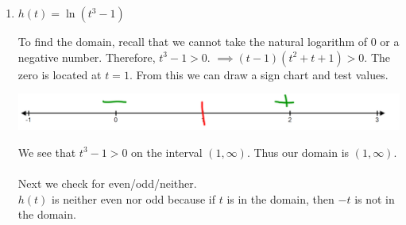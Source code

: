 \documentclass[nooutcomes]{ximera}
\begin{document}
\begin{problem}
\begin{enumerate}
\begin{freeResponse}
		\end{freeResponse}

	\item $h(t)= \ln(t^3-1)$

		\begin{freeResponse}
		To find the domain, recall that we cannot take the natural logarithm of $0$ or a negative number.  Therefore, $t^3-1>0$.
			$\implies (t-1)(t^2+t+1)>0$.  The zero is located at $t=1$.  From this we can draw a sign chart and test values.

	\begin{image}		
	\includegraphics[scale=0.2]{Figure10.png}
	\end{image}
		We see that $t^3-1>0$ on the interval $(1,\infty)$.  Thus our domain is $ (1,\infty)$.\\ \\
		
		Next we check for even/odd/neither.\\
		$h(t)$ is neither even nor odd because if $t$ is in the domain, then $-t$ is not in the domain.


		\end{freeResponse}

\end{enumerate}

\end{problem}
\end{document}
